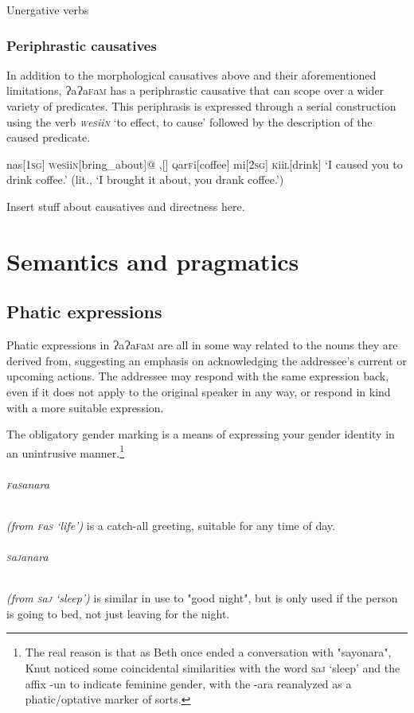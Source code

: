 \documentclass[a4paper,10pt,twoside,openright]{memoir}
\newcommand{\lang}{ɁaɁa\textsc{f}a\textsc{m}}
\newcommand{\famword}[5]{#1\textsc{#2}#3\textsc{#4}#5}
\begin{document}
Unergative verbs

\subsection{Periphrastic causatives}

In addition to the morphological causatives above and their aforementioned limitations, \lang{} has a periphrastic causative that can scope over a wider variety of predicates. This periphrasis is expressed through a serial construction using the verb \textit{\textsc{w}\famword{e}{s}{ii}{n}{}} `to effect, to cause' followed by the description of the caused predicate. 

\ex
\begingl
nas[\textsc{1sg}]
\textsc{w}\famword{e}{s}{ii}{n}{}[bring\_about]@
,[]
\famword{}{q}{ar}{f}{i}[coffee]
mi[\textsc{2sg}]
\famword{}{k}{ii}{l}{}[drink]
\glft `I caused you to drink coffee.' (lit., `I brought it about, you drank coffee.')
\endgl
\xe

Insert stuff about causatives and directness here.

\chapter{Semantics and pragmatics}
\section{Phatic expressions}

Phatic expressions in \lang{} are all in some way related to the nouns they are derived from, suggesting an emphasis on acknowledging the addressee's current or upcoming actions. The addressee may respond with the same expression back, even if it does not apply to the original speaker in any way, or respond in kind with a more suitable expression.

The obligatory gender marking is a means of expressing your gender identity in an unintrusive manner.\footnote{The real reason is that as Beth once ended a conversation with "sayonara", Knut noticed some coincidental similarities with the word \famword{}{s}{a}{j}{} `sleep' and the affix -un to indicate feminine gender, with the -ara reanalyzed as a phatic/optative marker of sorts.}

\subparagraph{\famword{}{f}{a}{s}{anara}} \textit{(from \famword{}{f}{a}{s}{} `life')} is a catch-all greeting, suitable for any time of day. 

\subparagraph{\famword{}{s}{a}{j}{anara}} \textit{(from \famword{}{s}{a}{j}{} `sleep')} is similar in use to "good night", but is only used if the person is going to bed, not just leaving for the night.
\end{document}
